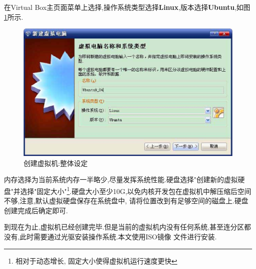 \documentclass[12pt,a4paper,titlepage]{article}
\begin{document}
在Virtual Box主页面菜单上选择,操作系统类型选择\textbf{Linux},版本选择\textbf{Ubuntu},如图\ref{f_create_vb1}所示.
\begin{figure}[!bthp]
\centering\includegraphics[width=1\textwidth]{pic/f_create_vb1.eps}
\caption{创建虚拟机:整体设定\label{f_create_vb1}}
\end{figure}
内存选择为当前系统内存一半略少,尽量发挥系统性能.硬盘选择"创建新的虚拟硬盘"并选择"固定大小"\footnote{相对于动态增长,
固定大小使得虚拟机运行速度更快}.硬盘大小至少10G,以免内核开发包在虚拟机中解压缩后空间不够,{注意,默认虚拟硬盘保存在系统盘中,
请将位置改到有足够空间的磁盘上}.硬盘创建完成后确定即可.

到现在为止,虚拟机已经创建完毕.但是当前的虚拟机内没有任何系统,甚至连分区都没有,此时需要通过光驱安装操作系统.本文使用ISO镜像
文件进行安装.
\end{document}
